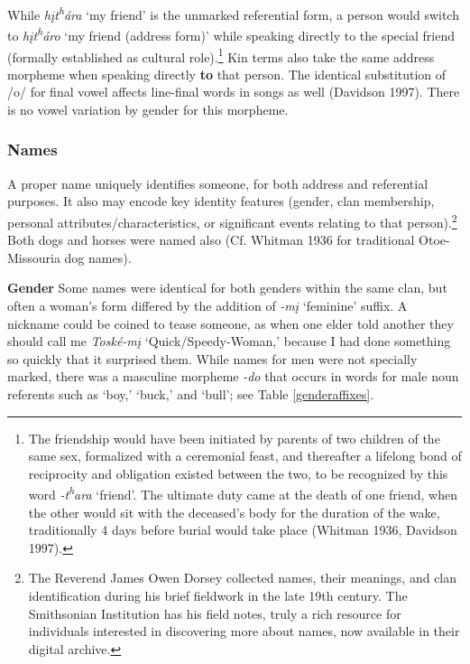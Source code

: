 \documentclass[output=paper]{LSP/langsci}
\begin{document}
While \textit{h\k{i}t\textsuperscript{h}\'ara} `my friend' is the unmarked referential form, a person would switch to \textit{h\k{i}t\textsuperscript{h}\'aro} `my friend (address form)' while speaking directly to the special friend (formally established as cultural role).\footnote{The friendship would have been initiated by parents of two children of the same sex, formalized with a ceremonial feast, and thereafter a lifelong bond of reciprocity and obligation existed between the two, to be recognized by this word \textit{-t\textsuperscript{h}ara} `friend'. The ultimate duty came at the death of one friend, when the other would sit with the deceased's body for the duration of the wake, traditionally 4 days before burial would take place (Whitman 1936, Davidson 1997).}  Kin terms also take the same address morpheme when speaking directly \textbf{to} that person. The identical substitution of /o/ for  final vowel affects line-final words in songs as well (Davidson 1997).  There is no vowel variation by gender for this morpheme.         
  
\subsubsection{Names}  A proper name uniquely identifies someone, for both address and referential purposes. It also may encode key identity features (gender, clan membership, personal attributes/characteristics, or significant events relating to that person).\footnote{The Reverend James Owen Dorsey collected names, their meanings, and clan identification during his brief fieldwork in the late 19th century. The Smithsonian Institution has his field notes, truly a rich resource for individuals interested in discovering more about names, now available in their digital archive.}  Both dogs and horses were named also (Cf. Whitman 1936 for traditional Otoe-Missouria dog names).  

\textbf{Gender} Some names were identical for both genders within the same clan, but often a woman's form differed by the addition of \textit{-m\k{i}} `feminine' suffix.  A nickname could be coined to tease someone, as when one elder told another they should call me \textit{Tosk\'e-m\k{i}} `Quick/Speedy-Woman,' because I had done something so quickly that it surprised them. While names for men were not specially marked, there was a masculine morpheme \textit{-do} that occurs in words for male noun referents such as `boy,' `buck,' and `bull'; see Table \ref{genderaffixes}.  
\end{document}
